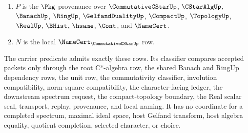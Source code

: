 \begin{definition}
\begin{enumerate}
$$$$
\item $P$ is the $\Pkg$ provenance over $\CommutativeCStarUp$, $\CStarAlgUp$, $\BanachUp$, $\RingUp$, $\GelfandDualityUp$, $\CompactUp$, $\TopologyUp$, $\RealUp$, $\BHist$, $\hsame$, $\Cont$, and $\NameCert$.
\item $N$ is the local $\NameCert_{\CommutativeCStarUp}$ row.
\end{enumerate}
The carrier predicate admits exactly these rows. Its classifier compares accepted packets only through the root C*-algebra row, the shared Banach and RingUp dependency rows, the unit row, the commutativity classifier, involution compatibility, norm-square compatibility, the character-facing ledger, the downstream spectrum request, the compact-topology boundary, the Real scalar seal, transport, replay, provenance, and local naming. It has no coordinate for a completed spectrum, maximal ideal space, host Gelfand transform, host algebra equality, quotient completion, selected character, or choice.
\end{definition}

